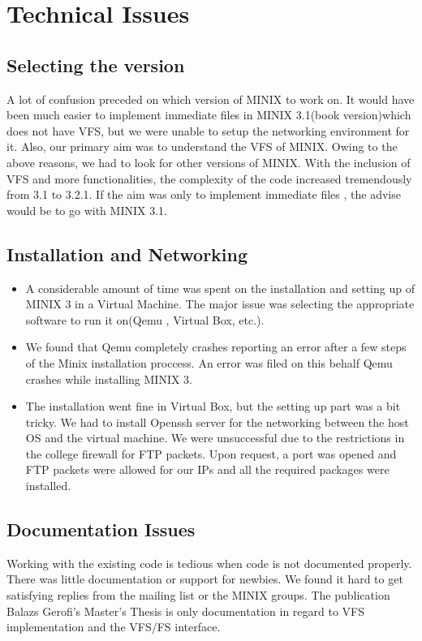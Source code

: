 \chapter{Technical Issues}

\section{Selecting the version} 

A lot of confusion preceded on which version of MINIX to work on. It would have been much easier to implement immediate files in MINIX 3.1(book version)which does not have VFS, but we were unable to setup the networking environment for it. Also, our primary aim was to understand the VFS of MINIX. Owing to the above reasons, we had to look for other versions of MINIX. With the inclusion of VFS and more functionalities, the complexity of the code increased tremendously from 3.1 to 3.2.1. If the aim was only to implement immediate files , the advise would be to go with MINIX 3.1.

\section{Installation and Networking}

\begin{itemize}
\item A considerable amount of time was spent on the installation and setting up of MINIX 3 in a Virtual Machine. The major issue was selecting the appropriate software to run it on(Qemu , Virtual Box, etc.). 
\item We found that Qemu completely crashes reporting an error after a few steps of the Minix installation proccess. An error was filed on this behalf Qemu crashes while installing MINIX 3.
\item The installation went fine in Virtual Box, but the setting up part was a bit tricky. We had to install Openssh server for the networking between the host OS and the virtual machine. We were unsuccessful due to the restrictions in the college firewall for FTP packets. Upon request, a port was opened and FTP packets were allowed for our IPs and all the required packages were installed.  
\end{itemize}
 

\section{Documentation Issues}

Working with the existing code is tedious when code is not documented properly. There was little documentation or support for newbies. We found it hard to get satisfying replies from the mailing list or the MINIX groups. The publication Balazs Gerofi's Master's Thesis is only documentation in regard to VFS implementation and the VFS/FS interface.
